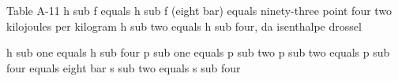 Table A-11  
h sub f equals h sub f (eight bar) equals ninety-three point four two kilojoules per kilogram  
h sub two equals h sub four, da isenthalpe drossel  

h sub one equals h sub four  
p sub one equals p sub two  
p sub two equals p sub four equals eight bar  
s sub two equals s sub four